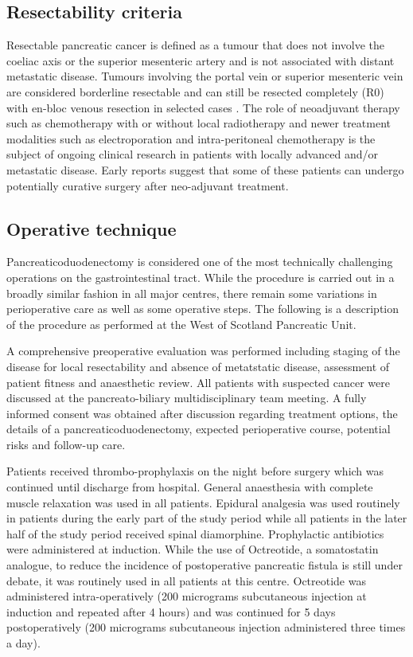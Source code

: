 \subsection{Resectability criteria}
\label{sec:resectability_criteria}
Resectable pancreatic cancer is defined as a tumour that does not involve the coeliac axis or the superior mesenteric artery and is not associated with distant metastatic disease. 
Tumours involving the portal vein or superior mesenteric vein are considered borderline resectable and can still be resected completely (R0) with en-bloc venous resection in selected cases \parencite{fuhrman_rationale_1996}. 
The role of neoadjuvant therapy such as chemotherapy with or without local radiotherapy and newer treatment modalities such as electroporation \parencite{bower_irreversible_2011} and intra-peritoneal chemotherapy is the subject of ongoing clinical research in patients with locally advanced and/or metastatic disease. 
Early reports suggest that some of these patients can undergo potentially curative surgery after neo-adjuvant treatment.


\subsection{Operative technique}
Pancreaticoduodenectomy is considered one of the most technically challenging operations on the gastrointestinal tract. 
While the procedure is carried out in a broadly similar fashion in all major centres, there remain some variations in perioperative care as well as some operative steps. 
The following is a description of the procedure as performed at the West of Scotland Pancreatic Unit.

A comprehensive preoperative evaluation was performed including staging of the disease for local resectability and absence of metatstatic disease, assessment of patient fitness and anaesthetic review. 
All patients with suspected cancer were discussed at the pancreato-biliary multidisciplinary team meeting. 
A fully informed consent was obtained after discussion regarding treatment options, the details of a pancreaticoduodenectomy, expected perioperative course, potential risks and follow-up care.

Patients received thrombo-prophylaxis on the night before surgery which was continued until discharge from hospital. 
General anaesthesia with complete muscle relaxation was used in all patients. 
Epidural analgesia was used routinely in patients during the early part of the study period while all patients in the later half of the study period received spinal diamorphine. 
Prophylactic antibiotics were administered at induction. 
While the use of Octreotide, a somatostatin analogue, to reduce the incidence of postoperative pancreatic fistula is still under debate, it was routinely used in all patients at this centre. 
Octreotide was administered intra-operatively (200 micrograms subcutaneous injection at induction and repeated after 4 hours) and was continued for 5 days postoperatively (200 micrograms subcutaneous injection administered three times a day).

